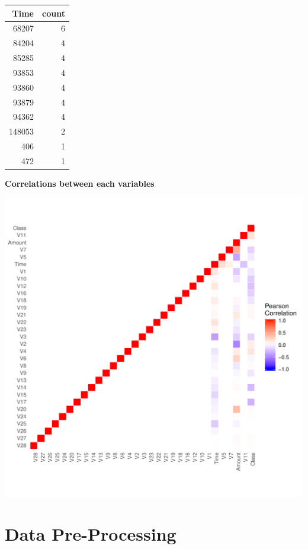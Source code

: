 \documentclass[]{article}
\begin{document}
\begin{table}[H]
\centering\begingroup\fontsize{10}{12}\selectfont

\begin{tabular}{r|r}
\hline
Time & count\\
\hline
68207 & 6\\
\hline
84204 & 4\\
\hline
85285 & 4\\
\hline
93853 & 4\\
\hline
93860 & 4\\
\hline
93879 & 4\\
\hline
94362 & 4\\
\hline
148053 & 2\\
\hline
406 & 1\\
\hline
472 & 1\\
\hline
\end{tabular}
\endgroup{}
\end{table}
\newpage

\textbf{Correlations between each variables}

\begin{center}\includegraphics{Credit_Card_Fraud_Detection_Project_Report_files/figure-latex/unnamed-chunk-14-1} \end{center}
\newpage

\hypertarget{data-pre-processing}{%
\section{Data Pre-Processing}\label{data-pre-processing}}
\end{document}
